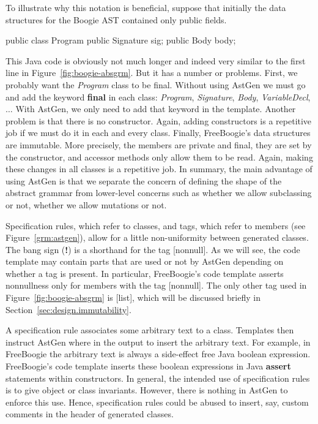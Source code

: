 \documentclass[a4paper]{article}
\theoremstyle{slanted}
\theoremstyle{definition}
\theoremstyle{remark}
\begin{document}
To illustrate why this notation is beneficial, suppose that
initially the data structures for the Boogie AST contained only
public fields.
\begin{jml}
public class Program {
  public Signature sig;
  public Body body;
}
\end{jml}
This Java code is obviously not much longer and indeed very
similar to the first line in Figure~\ref{fig:boogie-absgrm}.
But it has a number or problems. First, we probably want the
\textit{Program} class to be final. Without using AstGen
we must go and add the keyword \textbf{final} in each
class: \textit{Program}, \textit{Signature}, \textit{Body},
\textit{VariableDecl}, $\ldots$ With AstGen, we only need to add
that keyword in the template. Another problem is that there is no
constructor. Again, adding constructors is a repetitive job if we
must do it in each and every class. Finally, FreeBoogie's data
structures are immutable. More precisely, the members are private
and final, they are set by the constructor, and accessor methods
only allow them to be read. Again, making these changes in all
classes is a repetitive job. In summary, the main advantage of
using AstGen is that we separate the concern of defining the
shape of the abstract grammar from lower-level concerns such as
whether we allow subclassing or not, whether we allow mutations
or not.

Specification rules, which refer to classes, and tags, which
refer to members (see Figure~\ref{grm:astgen}), allow for a
little non-uniformity between generated classes. The bang
sign (\textbf{!}) is a shorthand for the tag [nonnull]. As we
will see, the code template may contain parts that are used
or not by AstGen depending on whether a tag is present. In
particular, FreeBoogie's code template asserts nonnullness only
for members with the tag [nonnull]. The only other tag used in
Figure~\ref{fig:boogie-absgrm} is [list], which will be discussed
briefly in Section~\ref{sec:design.immutability}.

A specification rule associates some arbitrary text to a class.
Templates then instruct AstGen where in the output to insert
the arbitrary text. For example, in FreeBoogie the arbitrary
text is always a side-effect free Java boolean expression.
FreeBoogie's code template inserts these boolean expressions in
Java \textbf{assert} statements within constructors. In general,
the intended use of specification rules is to give object or
class invariants. However, there is nothing in AstGen to enforce
this use. Hence, specification rules could be abused to insert,
say, custom comments in the header of generated classes.
\end{document}
